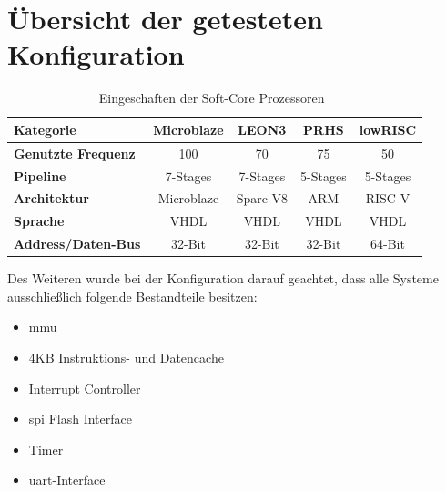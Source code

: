 \section{Übersicht der getesteten Konfiguration}\label{kap:getestetekonfiguration}


\begin{table}[H]
\centering
\begin{tabular}{|l|c|c|c|c|}
  \hline
  \textbf{Kategorie} & \textbf{Microblaze} & \textbf{LEON3}& \textbf{PRHS}& \textbf{lowRISC}\\
  \hline
  \textbf{Genutzte Frequenz} &100 & 70 & 75 & 50\\
  \hline
  \textbf{Pipeline} & 7-Stages & 7-Stages & 5-Stages & 5-Stages\\
  \hline
  \textbf{Architektur} & Microblaze & Sparc V8  & ARM &  RISC-V\\
  \hline
  \textbf{Sprache} & VHDL & VHDL & VHDL & VHDL\\
    \hline
  \textbf{Address/Daten-Bus} & 32-Bit & 32-Bit & 32-Bit & 64-Bit\\
      \hline
\end{tabular}
  \caption{Eingeschaften der Soft-Core Prozessoren~\cite{comparison}}
 \label{tab:features}
  \end{table}

\newpage
Des Weiteren wurde bei der Konfiguration darauf geachtet, dass alle Systeme ausschließlich folgende Bestandteile besitzen:\\
\begin{itemize}
  \item \ac{mmu}
  \item 4KB Instruktions- und Datencache
  \item Interrupt Controller
  \item \ac{spi} Flash Interface
  \item Timer
  \item \ac{uart}-Interface
\end{itemize}

